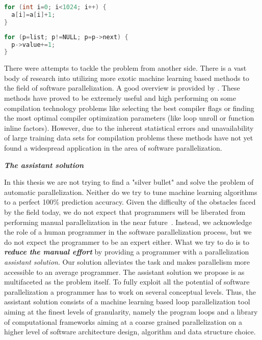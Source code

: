 \begin{description}[style=unboxed,leftmargin=0cm]
\begin{minipage}[t]{0.5\linewidth}
\begin{lstlisting}[caption={\raggedright Parallelizable loop operating on a \textbf{flat array}.},label={lst:introduction_array},language=C]
for (int i=0; i<1024; i++) {
  a[i]=a[i]+1;
}
\end{lstlisting}
\end{minipage}
%
\begin{minipage}[t]{0.5\linewidth}
\begin{lstlisting}[caption={\raggedright Non-parallelizable loop operating on a \textbf{linked-list}.},label={lst:introduction_list},language=C]
for (p=list; p!=NULL; p=p->next) {
  p->value+=1;
}
\end{lstlisting}
\end{minipage}
\item[\textit{Machine learning based parallelization applicability}] There were attempts to tackle the problem from another side. There is a vast body of research into utilizing more exotic machine learning based methods to the field of software parallelization. A good overview is provided by \cite{ml-oboyle}. These methods have proved to be extremely useful and high performing on some compilation technology problems like selecting the best compiler flags or finding the most optimal compiler optimization parameters (like loop unroll or function inline factors). However, due to the inherent statistical errors and unavailability of large training data sets for compilation problems these methods have not yet found a widespread application in the area of software parallelization.
\end{description}
\begin{center}
\textbf{\large \textit{The assistant solution}}
\end{center}
\quad In this thesis we are not trying to find a "silver bullet" and solve the problem of automatic parallelization. Neither do we try to tune machine learning algorithms to a perfect 100\% prediction accuracy. Given the difficulty of the obstacles faced by the field today, we do not expect that programmers will be liberated from performing manual parallelization in the near future~\cite{Larsen:2012:PML:2410141.2410600}. Instead, we acknowledge the role of a human programmer in the software parallelization process, but we do not expect the programmer to be an expert either. What we try to do is to \textit{\textbf{reduce the manual effort}} by providing a programmer with a parallelization \textit{assistant solution}. Our solution alleviates the task and makes parallelism more accessible to an average programmer. The assistant solution we propose is as multifaceted as the problem itself. To fully exploit all the potential of software parallelization a programmer has to work on several conceptual levels. Thus, the assistant solution consists of a machine learning based loop parallelization tool \cite{assistant-aiseps} aiming at the finest levels of granularity, namely the program loops and a library of computational frameworks \cite{frameworks-repo} aiming at a coarse grained parallelization on a higher level of software architecture design, algorithm and data structure choice.
